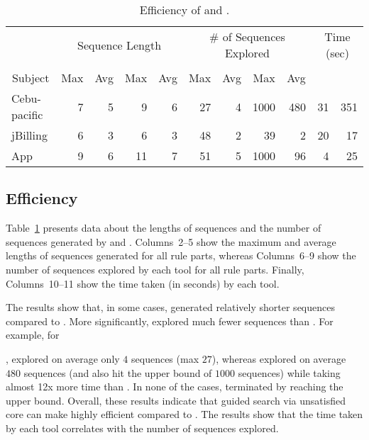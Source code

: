 \begin{table}[t]
\caption{Efficiency of \tool{} and \exhaust{}.}
\centering
{\scriptsize
\tabcolsep=3pt
\begin{tabular}{|l|r|r|r|r|r|r|r|r|r|r|}
\hline
& \multicolumn{4}{|c|}{Sequence Length} & \multicolumn{4}{|c|}{\# of Sequences Explored} & \multicolumn{2}{|c|}{Time (sec)} \\
\cline{2-11}
& \multicolumn{2}{|c|}{\tool{}} & \multicolumn{2}{|c|}{\exhaust{}} &
\multicolumn{2}{|c|}{\tool{}} & \multicolumn{2}{|c|}{\exhaust{}} &
\multicolumn{1}{|c|}{\tool{}} & \multicolumn{1}{|c|}{\exhaust{}} \\
\cline{2-9}
\multicolumn{1}{|c|}{Subject} & \multicolumn{1}{|c|}{Max} & \multicolumn{1}{|c|}{Avg} & \multicolumn{1}{|c|}{Max} & \multicolumn{1}{|c|}{Avg} & \multicolumn{1}{|c|}{Max} & \multicolumn{1}{|c|}{Avg} & \multicolumn{1}{|c|}{Max} & \multicolumn{1}{|c|}{Avg} & &  \\
\hline \hline
Cebu-pacific & 7 & 5 & 9 & 6 & 27 & 4 & 1000 & 480 & 31 & 351 \\
jBilling & 6 & 3 &  6 &  3 & 48 & 2 & 39 & 2 & 20 & 17 \\
App & 9	& 6 & 11 & 7 & 51 & 5 & 1000 & 96 & 4 & 25 \\
\hline
\end{tabular}
}
\label{tab:stats}
\end{table}

\subsection{Efficiency}

Table~\ref{tab:stats} presents data about the lengths of sequences and the
number of sequences generated by \tool{} and \exhaust{}. Columns~2--5 show the
maximum and average lengths of sequences generated for all rule parts, whereas
Columns~6--9 show the number of sequences explored by each tool for all rule
parts. Finally, Columns~10--11 show the time taken (in seconds) by each tool.

The results show that, in some cases, \tool{} generated relatively shorter
sequences compared to \exhaust{}. More significantly, \tool{} explored much
fewer sequences than \exhaust{}. For example, for \subject{Cebu-pacific},
\tool{} explored on average only $4$ sequences (max $27$), whereas
\exhaust{} explored on average $480$ sequences (and also hit
the upper bound of $1000$ sequences) while taking almost 12x more time than
\tool{}. In none of the cases, \tool{} terminated by reaching the upper
bound. Overall, these results indicate that guided search via unsatisfied core
can make \tool{} highly efficient compared to \exhaust{}. The results show that
the time taken by each tool correlates with the number of sequences explored.

